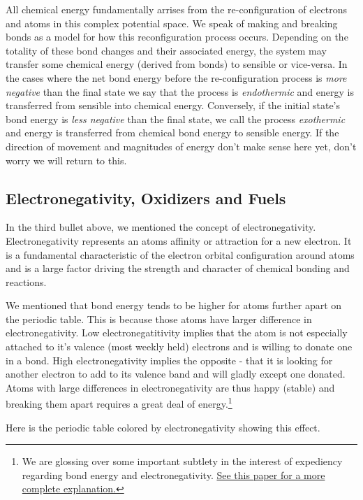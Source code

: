 \documentclass[twocolumn]{memoir} %
\begin{document}
All chemical energy fundamentally arrises from the re-configuration of electrons and atoms in this complex
potential space.  We speak of making and breaking bonds as a model for how this reconfiguration process
occurs.  Depending on the totality of these bond changes and their associated energy, the system may 
transfer some chemical energy (derived from bonds) to sensible or vice-versa.  In the cases where the net
bond energy before the re-configuration process is \emph{more negative} than the final state we say that the process
is \emph{endothermic} and energy is transferred from sensible into chemical energy.  Conversely, if the initial 
state's bond energy is \emph{less negative} than the final state, we call the process \emph{exothermic} and energy
is transferred from chemical bond energy to sensible energy.  If the direction  of movement and magnitudes of
energy don't make sense here yet, don't worry we will return to this.

\subsection{Electronegativity, Oxidizers and Fuels}
In the third bullet above, we mentioned the concept of electronegativity.  Electronegativity represents an atoms
affinity or attraction for a new electron.  It is a fundamental characteristic of the electron orbital configuration
around atoms and is a large factor driving the strength and character of chemical bonding and reactions.

We mentioned that bond energy tends to be higher for atoms further apart on the periodic table.  This is because
those atoms have larger difference in electronegativity.  Low electronegatitivity implies that the atom is not
especially attached to it's valence (most weekly held) electrons and is willing to donate one in a bond.
High electronegativity implies the opposite - that it is looking for another electron to add to its valence
band and will gladly except one donated.  Atoms with large differences in electronegativity are thus happy (stable)
and breaking them apart requires a great deal of energy.\footnote{We are glossing over some important subtlety
in the interest of expediency regarding bond energy and electronegativity.  
\href{https://pubs.acs.org/doi/full/10.1021/acs.jchemed.5b00333}{See this paper for a more complete explanation.}}

Here is the periodic table colored by electronegativity showing this effect.
\end{document}
